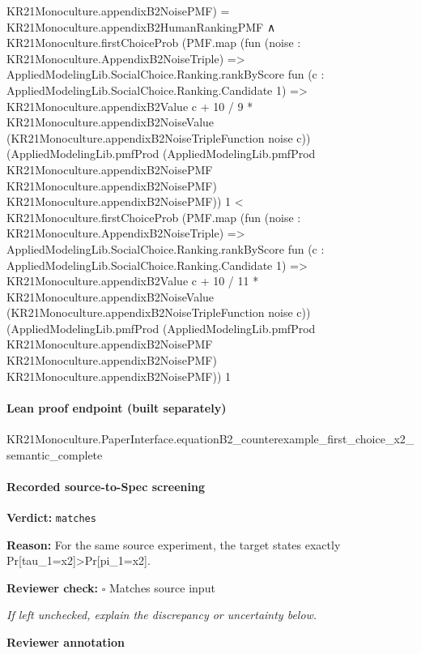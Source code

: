 \documentclass[10pt]{article}
\newcommand{\reviewerbox}{%
  \par\noindent\fbox{\parbox{0.96\linewidth}{\rule{0pt}{0.38in}}}\par
}
\newcommand{\reviewmatch}[1]{%
  \par\noindent\textbf{Reviewer check:} $\square$\; #1\par
  \noindent\emph{If left unchecked, explain the discrepancy or uncertainty below.}\par
}
\begin{document}
\begin{ReviewVerbatim}
                      KR21Monoculture.appendixB2NoisePMF) =
                  KR21Monoculture.appendixB2HumanRankingPMF ∧
                KR21Monoculture.firstChoiceProb
                    (PMF.map
                      (fun (noise : KR21Monoculture.AppendixB2NoiseTriple) =>
                        AppliedModelingLib.SocialChoice.Ranking.rankByScore
                          fun (c : AppliedModelingLib.SocialChoice.Ranking.Candidate 1) =>
                          KR21Monoculture.appendixB2Value c +
                            10 / 9 *
                              KR21Monoculture.appendixB2NoiseValue
                                (KR21Monoculture.appendixB2NoiseTripleFunction noise c))
                      (AppliedModelingLib.pmfProd
                        (AppliedModelingLib.pmfProd KR21Monoculture.appendixB2NoisePMF
                          KR21Monoculture.appendixB2NoisePMF)
                        KR21Monoculture.appendixB2NoisePMF))
                    1 <
                  KR21Monoculture.firstChoiceProb
                    (PMF.map
                      (fun (noise : KR21Monoculture.AppendixB2NoiseTriple) =>
                        AppliedModelingLib.SocialChoice.Ranking.rankByScore
                          fun (c : AppliedModelingLib.SocialChoice.Ranking.Candidate 1) =>
                          KR21Monoculture.appendixB2Value c +
                            10 / 11 *
                              KR21Monoculture.appendixB2NoiseValue
                                (KR21Monoculture.appendixB2NoiseTripleFunction noise c))
                      (AppliedModelingLib.pmfProd
                        (AppliedModelingLib.pmfProd KR21Monoculture.appendixB2NoisePMF
                          KR21Monoculture.appendixB2NoisePMF)
                        KR21Monoculture.appendixB2NoisePMF))
                    1
\end{ReviewVerbatim}

\paragraph{Lean proof endpoint (built separately)}\begin{ReviewVerbatim}
KR21Monoculture.PaperInterface.equationB2_counterexample_first_choice_x2_semantic_complete
\end{ReviewVerbatim}

\paragraph{Recorded source-to-Spec screening}
\textbf{Verdict:} \texttt{matches}
\\
{\raggedright
\textbf{Reason:} For the same source experiment, the target states exactly Pr[tau\_\allowbreak{}1=x2]>Pr[pi\_\allowbreak{}1=x2].\allowbreak{}
\par}
\reviewmatch{Matches source input}
\noindent\textbf{Reviewer annotation}\par
\reviewerbox
\clearpage
\hypertarget{source-claim-34bc63da82092219}{}
\end{document}
